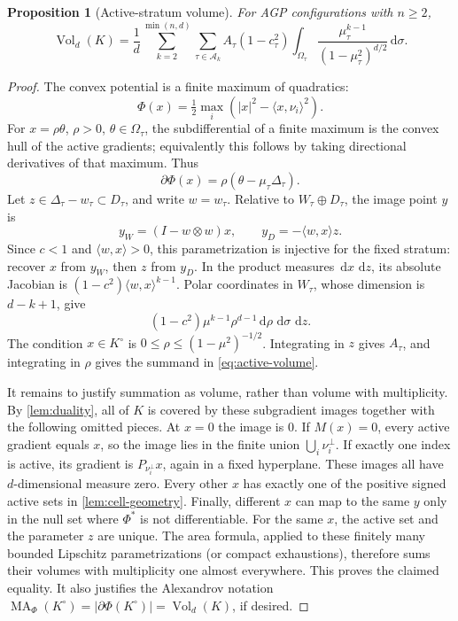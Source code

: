 \documentclass[10pt,reqno]{amsart}
\newtheorem{proposition}[theorem]{Proposition}
\theoremstyle{definition}
\theoremstyle{remark}
\newcommand{\Vol}{\operatorname{Vol}}
\newcommand{\MA}{\operatorname{MA}}
\newcommand{\dd}{\,\mathrm d}
\newcommand{\ip}[2]{\langle #1,#2\rangle}
\begin{document}
\begin{proposition}[Active-stratum volume]\label{prop:active-volume}
For AGP configurations with $n\ge2$,
\begin{equation}\label{eq:active-volume}
\boxed{\Vol_d(K)=\frac1d\sum_{k=2}^{\min(n,d)}\sum_{\tau\in\mathcal A_k}
A_\tau(1-c_\tau^2)\int_{\Omega_\tau}
\frac{\mu_\tau^{k-1}}{(1-\mu_\tau^2)^{d/2}}\dd\sigma.}
\end{equation}
\end{proposition}
\begin{proof}
The convex potential is a finite maximum of quadratics:
\[
\Phi(x)=\tfrac12\max_i(|x|^2-\ip{x}{\nu_i}^2).
\]
For $x=\rho\theta$, $\rho>0$, $\theta\in\Omega_\tau$, the subdifferential of a finite maximum is the convex hull of the active gradients; equivalently this follows by taking directional derivatives of that maximum. Thus
\begin{equation}\label{eq:subgradient-simplex}
\partial\Phi(x)=\rho(\theta-\mu_\tau\Delta_\tau).
\end{equation}
Let $z\in\Delta_\tau-w_\tau\subset D_\tau$, and write $w=w_\tau$. Relative to $W_\tau\oplus D_\tau$, the image point $y$ is
\begin{equation}\label{eq:block-map}
y_W=(I-w\otimes w)x,\qquad y_D=-\ip{w}{x}z.
\end{equation}
Since $c<1$ and $\ip{w}{x}>0$, this parametrization is injective for the fixed stratum: recover $x$ from $y_W$, then $z$ from $y_D$. In the product measures $\dd x\,\dd z$, its absolute Jacobian is
$(1-c^2)\ip{w}{x}^{k-1}$. Polar coordinates in $W_\tau$, whose dimension is $d-k+1$, give
\[
(1-c^2)\mu^{k-1}\rho^{d-1}\dd\rho\,\dd\sigma\,\dd z.
\]
The condition $x\in K^\circ$ is $0\le\rho\le(1-\mu^2)^{-1/2}$. Integrating in $z$ gives $A_\tau$, and integrating in $\rho$ gives the summand in \eqref{eq:active-volume}.

It remains to justify summation as volume, rather than volume with multiplicity. By \cref{lem:duality}, all of $K$ is covered by these subgradient images together with the following omitted pieces. At $x=0$ the image is $0$. If $M(x)=0$, every active gradient equals $x$, so the image lies in the finite union $\bigcup_i\nu_i^\perp$. If exactly one index is active, its gradient is $P_{\nu_i^\perp}x$, again in a fixed hyperplane. These images all have $d$-dimensional measure zero. Every other $x$ has exactly one of the positive signed active sets in \cref{lem:cell-geometry}. Finally, different $x$ can map to the same $y$ only in the null set where $\Phi^*$ is not differentiable. For the same $x$, the active set and the parameter $z$ are unique. The area formula, applied to these finitely many bounded Lipschitz parametrizations (or compact exhaustions), therefore sums their volumes with multiplicity one almost everywhere. This proves the claimed equality. It also justifies the Alexandrov notation $\MA_\Phi(K^\circ)=|\partial\Phi(K^\circ)|=\Vol_d(K)$, if desired.
\end{proof}
\end{document}

